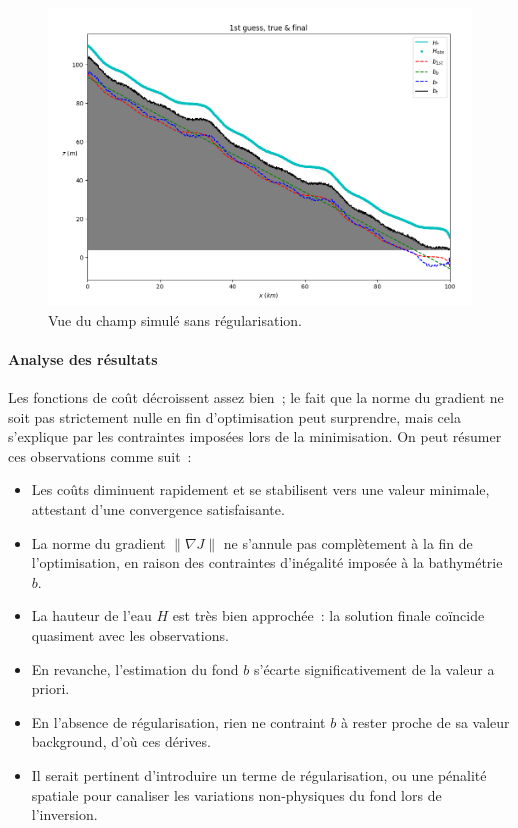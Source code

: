 \documentclass{article}
\begin{document}
\begin{figure}[H]

    \begin{minipage}[b]{0.55\linewidth}
        \centering
        \includegraphics[width=\linewidth]{Images_Ayoub/No_Regularisation/View.png}
        \caption{Vue du champ simulé sans régularisation.}
        \label{fig:view}
    \end{minipage}
\end{figure}


\paragraph{Analyse des résultats}
Les fonctions de coût décroissent assez bien ; le fait que la norme du gradient ne soit pas strictement nulle en fin d’optimisation peut surprendre, mais cela s’explique par les contraintes imposées lors de la minimisation. On peut résumer ces observations comme suit :

\begin{itemize}
  \item Les coûts diminuent rapidement et se stabilisent vers une valeur minimale, attestant d’une convergence satisfaisante.
  \item La norme du gradient \(\|\nabla J\|\) ne s’annule pas complètement à la fin de l’optimisation, en raison des contraintes d'inégalité  imposée à la bathymétrie $b$.
  \item La hauteur de l'eau \(H\) est très bien approchée : la solution finale coïncide quasiment avec les observations.
  \item En revanche, l’estimation du fond \(b\) s’écarte significativement de la valeur a priori.
  \item En l’absence de régularisation, rien ne contraint \(b\) à rester proche de sa valeur background, d’où ces dérives.
  \item Il serait pertinent d’introduire un terme de régularisation, ou une pénalité spatiale pour canaliser les variations non‑physiques du fond lors de l’inversion.
\end{itemize}
\end{document}
